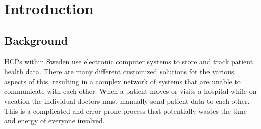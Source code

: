 \documentclass[14pt]{article}
\begin{document}
\begin{abstract}


\glspl{EHR} are rapidly expanding in their use and their benefits are well known. Significant reduction in the cost of care, improved quality of care, and improved record keeping are just a few of the benefits of using an \gls{EHR}. It is for these reasons that many medical institutions are rapidly adopting \glspl{EHR}. 

An explosion of innovation has stemmed from this rapid adoption and has produced many different solutions from many different providers. Unfortunately, these solutions tend to store and transmit the information that they collect in formats that are not compatible with each other. In order to maximize the benefit received from these \glspl{EHR} they must be able to share information between different systems and locations.

This paper reports on the various aspects of achieving \gls{EHR} \gls{interoperability}.
\end{abstract}

\newpage

\tableofcontents

\newpage

%
%
%

\section{Introduction}
\label{sec:Introduction}

\subsection{Background}
\glspl{HCP} within Sweden use electronic computer systems to store and track patient health data. There are many different customized solutions for the various aspects of this, resulting in a complex network of systems that are unable to communicate with each other. When a patient moves or visits a hospital while on vacation the individual doctors must manually send patient data to each other. This is a complicated and error-prone process that potentially wastes the time and energy of everyone involved.
\end{document}
